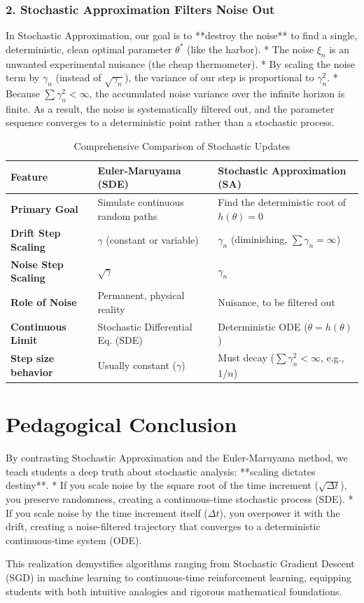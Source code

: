 \documentclass[11pt]{article}
\begin{document}
\subsubsection{2. Stochastic Approximation Filters Noise Out}
In Stochastic Approximation, our goal is to **destroy the noise** to find a single, deterministic, clean optimal parameter $\theta^*$ (like the harbor). 
* The noise $\xi_n$ is an unwanted experimental nuisance (the cheap thermometer).
* By scaling the noise term by $\gamma_n$ (instead of $\sqrt{\gamma_n}$), the variance of our step is proportional to $\gamma_n^2$.
* Because $\sum \gamma_n^2 < \infty$, the accumulated noise variance over the infinite horizon is finite. As a result, the noise is systematically filtered out, and the parameter sequence converges to a deterministic point rather than a stochastic process.

\begin{table}[H]
\centering
\caption{Comprehensive Comparison of Stochastic Updates}
\label{tab:comparison}
\begin{tabular}{lll}
\toprule
\textbf{Feature} & \textbf{Euler-Maruyama (SDE)} & \textbf{Stochastic Approximation (SA)} \\
\midrule
\textbf{Primary Goal} & Simulate continuous random paths & Find the deterministic root of $h(\theta)=0$ \\
\textbf{Drift Step Scaling} & $\gamma$ (constant or variable) & $\gamma_n$ (diminishing, $\sum \gamma_n = \infty$) \\
\textbf{Noise Step Scaling} & $\sqrt{\gamma}$ & $\gamma_n$ \\
\textbf{Role of Noise} & Permanent, physical reality & Nuisance, to be filtered out \\
\textbf{Continuous Limit} & Stochastic Differential Eq. (SDE) & Deterministic ODE ($\dot{\theta} = h(\theta)$) \\
\textbf{Step size behavior} & Usually constant ($\gamma$) & Must decay ($\sum \gamma_n^2 < \infty$, e.g., $1/n$) \\
\bottomrule
\end{tabular}
\end{table}

\section{Pedagogical Conclusion}

By contrasting Stochastic Approximation and the Euler-Maruyama method, we teach students a deep truth about stochastic analysis: **scaling dictates destiny**. 
* If you scale noise by the square root of the time increment ($\sqrt{\Delta t}$), you preserve randomness, creating a continuous-time stochastic process (SDE).
* If you scale noise by the time increment itself ($\Delta t$), you overpower it with the drift, creating a noise-filtered trajectory that converges to a deterministic continuous-time system (ODE).

This realization demystifies algorithms ranging from Stochastic Gradient Descent (SGD) in machine learning to continuous-time reinforcement learning, equipping students with both intuitive analogies and rigorous mathematical foundations.
\end{document}
